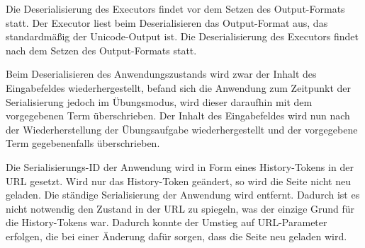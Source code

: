 \documentclass[parskip=full,11pt,openany]{scrreprt}
\begin{document}
\begin{itemize}[itemsep=3ex]
	{Die Deserialisierung des Executors findet vor dem Setzen des Output-Formats statt. Der Executor liest beim Deserialisieren das Output-Format aus, das standardmäßig der Unicode-Output ist.}
	{Die Deserialisierung des Executors findet nach dem Setzen des Output-Formats statt.}
	
	{Beim Deserialisieren des Anwendungszustands wird zwar der Inhalt des Eingabefeldes wiederhergestellt, befand sich die Anwendung zum Zeitpunkt der Serialisierung jedoch im Übungsmodus, wird dieser daraufhin mit dem vorgegebenen Term 			überschrieben.}
	{Der Inhalt des Eingabefeldes wird nun nach der Wiederherstellung der Übungsaufgabe wiederhergestellt und der vorgegebene Term gegebenenfalls überschrieben.}
	
	{Die Serialisierungs-ID der Anwendung wird in Form eines History-Tokens in der URL gesetzt. Wird nur das History-Token geändert, so wird die Seite nicht neu geladen.}
	{Die ständige Serialisierung der Anwendung wird entfernt. Dadurch ist es nicht notwendig den Zustand in der URL zu spiegeln, was der einzige Grund für die History-Tokens war.
	Dadurch konnte der Umstieg auf URL-Parameter erfolgen, die bei einer Änderung dafür sorgen, dass die Seite neu geladen wird.}
\end{itemize}
\end{document}
